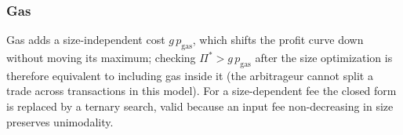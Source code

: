 \documentclass[a4paper,conference]{IEEEtran}
\begin{document}
\subsubsection{Gas}
Gas adds a size-independent cost $g\,p_{\mathrm{gas}}$, which shifts the
profit curve down without moving its maximum; checking
$\Pi^{*}>g\,p_{\mathrm{gas}}$ after the size optimization is therefore
equivalent to including gas inside it (the arbitrageur cannot split a
trade across transactions in this model). For a size-dependent fee the
closed form is replaced by a ternary search, valid because an input fee
non-decreasing in size preserves unimodality.


\end{document}
